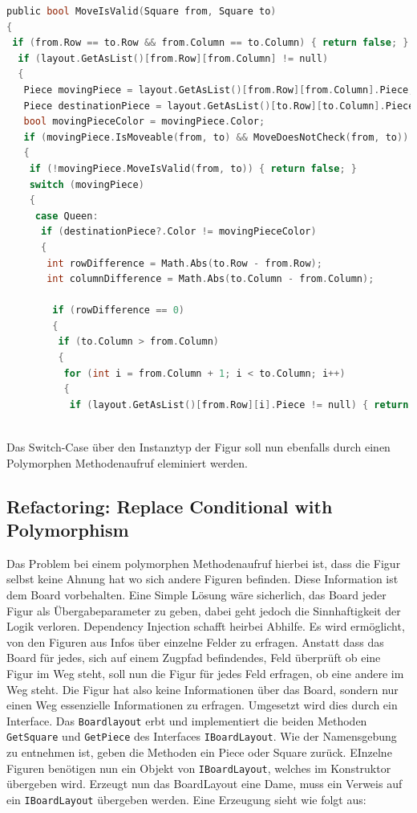 \documentclass[
10pt, %
a4paper, %
oneside, %
headinclude,footinclude, %
BCOR5mm, %
]{scrartcl}
\begin{document}
\begin{lstlisting}[language=c, style=mStyle]
public bool MoveIsValid(Square from, Square to)
{
 if (from.Row == to.Row && from.Column == to.Column) { return false; }
  if (layout.GetAsList()[from.Row][from.Column] != null)
  {
   Piece movingPiece = layout.GetAsList()[from.Row][from.Column].Piece;
   Piece destinationPiece = layout.GetAsList()[to.Row][to.Column].Piece;
   bool movingPieceColor = movingPiece.Color;
   if (movingPiece.IsMoveable(from, to) && MoveDoesNotCheck(from, to))
   {
	if (!movingPiece.MoveIsValid(from, to)) { return false; }
	switch (movingPiece)
	{
	 case Queen:
	  if (destinationPiece?.Color != movingPieceColor)
	  {
	   int rowDifference = Math.Abs(to.Row - from.Row);
	   int columnDifference = Math.Abs(to.Column - from.Column);

	    if (rowDifference == 0)
		{
		 if (to.Column > from.Column)
		 {
		  for (int i = from.Column + 1; i < to.Column; i++)
		  {
		   if (layout.GetAsList()[from.Row][i].Piece != null) { return false; }
		  
\end{lstlisting}

Das Switch-Case über den Instanztyp der Figur soll nun ebenfalls durch einen Polymorphen Methodenaufruf eleminiert werden. 

\subsection{Refactoring: Replace Conditional with Polymorphism}
Das Problem bei einem polymorphen Methodenaufruf hierbei ist, dass die Figur selbst keine Ahnung hat wo sich andere Figuren befinden. Diese Information ist dem Board vorbehalten. Eine Simple Lösung wäre sicherlich, das Board jeder Figur als Übergabeparameter zu geben, dabei geht jedoch die Sinnhaftigkeit der Logik verloren. Dependency Injection schafft heirbei Abhilfe. Es wird ermöglicht, von den Figuren aus Infos über einzelne Felder zu erfragen. Anstatt dass das Board für jedes, sich auf einem Zugpfad befindendes, Feld überprüft ob eine Figur im Weg steht, soll nun die Figur für jedes Feld erfragen, ob eine andere im Weg steht. Die Figur hat also keine Informationen über das Board, sondern nur einen Weg essenzielle Informationen zu erfragen. Umgesetzt wird dies durch ein Interface. Das \texttt{Boardlayout} erbt und implementiert die beiden Methoden \texttt{GetSquare} und \texttt{GetPiece} des Interfaces \texttt{IBoardLayout}. Wie der Namensgebung zu entnehmen ist, geben die Methoden ein Piece oder Square zurück. EInzelne Figuren benötigen nun ein Objekt von \texttt{IBoardLayout}, welches im Konstruktor übergeben wird. Erzeugt nun das BoardLayout eine Dame, muss ein Verweis auf ein \texttt{IBoardLayout} übergeben werden. Eine Erzeugung sieht wie folgt aus:
\end{document}
